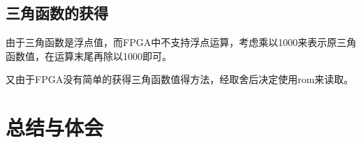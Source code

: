 \documentclass[UTF8]{article}
\begin{document}
\subsection{三角函数的获得}
由于三角函数是浮点值，而FPGA中不支持浮点运算，考虑乘以1000来表示原三角函数值，在运算末尾再除以1000即可。\par
又由于FPGA没有简单的获得三角函数值得方法，经取舍后决定使用rom来读取。

\section{总结与体会}
\end{document}
